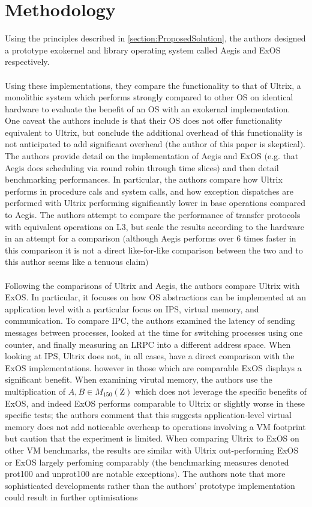 \documentclass[11pt]{article}
\theoremstyle{plain}
\theoremstyle{definition}
\begin{document}
\section{Methodology}\label{section:Methodology}
Using the principles described in \ref{section:ProposedSolution}, the authors designed a prototype exokernel and library operating system called Aegis and ExOS respectively.\\
\\
Using these implementations, they compare the functionality to that of Ultrix, a monolithic system which performs strongly compared to other OS on identical hardware to evaluate the benefit of an OS with an exokernal implementation. One caveat the authors include is that their OS does not offer functionality equivalent to Ultrix, but conclude the additional overhead of this functionality is not anticipated to add significant overhead $($the author of this paper is skeptical$)$. The authors provide detail on the implementation of Aegis and ExOS $($e.g. that Aegis does scheduling via round robin through time slices$)$ and then detail benchmarking performances. In particular, the authors compare how Ultrix performs in procedure cals and system calls, and how exception dispatches are performed with Ultrix performing significantly lower in base operations compared to Aegis. The authors attempt to compare the performance of transfer protocols with equivalent operations on L3, but scale the results according to the hardware in an attempt for a comparison $($although Aegis performs over $6$ times faster in this comparison it is not a direct like-for-like comparison between the two and to this author seems like a tenuous claim$)$\\
\\
Following the comparisons of Ultrix and Aegis, the authors compare Ultrix with ExOS. In particular, it focuses on how OS abstractions can be implemented at an application level with a particular focus on IPS, virtual memory, and communication. To compare IPC, the authors examined the latency of sending messages between processes, looked at the time for switching processes using one counter, and finally measuring an LRPC into a different address space. When looking at IPS, Ultrix does not, in all cases, have a direct comparison with the ExOS implementations. however in those which are comparable ExOS displays a significant benefit. When examining virutal memory, the authors use the multiplication of $A,B \in M_{150} \left(\mathrm{Z} \right)$ which does not leverage the specific benefits of ExOS, and indeed ExOS performs comparable to Ultrix or slightly worse in these specific tests; the authors comment that this suggests application-level virtual memory does not add noticeable overheap to operations involving a VM footprint but caution that the experiment is limited. When comparing Ultrix to ExOS on other VM benchmarks, the results are similar with Ultrix out-performing ExOS or ExOS largely perfoming comparably $($the benchmarking measures denoted prot100 and unprot100 are notable exceptions$)$. The authors note that more sophisticated developments rather than the authors' prototype implementation could result in further optimisations\\
\end{document}
